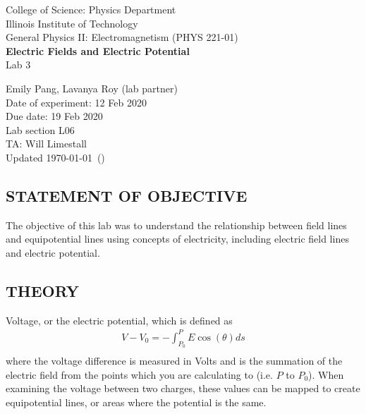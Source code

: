 \documentclass [12pt, letterpaper, twoside] {article}
\begin{document}
\begin {titlepage}
\begin {center}
College of Science: Physics Department \\
\vspace {0.1cm}
Illinois Institute of Technology\\
\vspace {0.1cm}
General Physics II: Electromagnetism (PHYS 221-01)\\
\vspace* {\fill}
\begingroup
\Large
\textbf {Electric Fields and Electric Potential} \\
\vspace {0.35cm}
\normalsize
Lab 3
\vspace {1.5cm}
\endgroup
\vspace* {\fill}
\end {center}

\vspace*{\fill}
\begin {flushright}
\footnotesize
Emily Pang, Lavanya Roy (lab partner) \\
Date of experiment: 12 Feb 2020 \\
Due date: 19 Feb 2020 \\
Lab section L06 \\
TA: Will Limestall \\
Updated \usdate\today~(\currenttime)
\end {flushright}
\end {titlepage}
\subsection* {STATEMENT OF OBJECTIVE}
The objective of this lab was to understand the relationship between field lines and equipotential lines using concepts of electricity, including electric field lines and electric potential.

\subsection* {THEORY}
Voltage, or the electric potential, which is defined as
\begin{equation}
  \begin{split}
    V - V_{0} = -\int_{P_{0}}^{P}E\cos(\theta)ds \\
  \end{split}
\end{equation}
where the voltage difference is measured in Volts and is the summation of the electric field from the points which you are calculating to (i.e. \(P\) to \(P_{0}\)).\cite{labManual} When examining the voltage between two charges, these values can be mapped to create equipotential lines, or areas where the potential is the same. 
\end{document}
